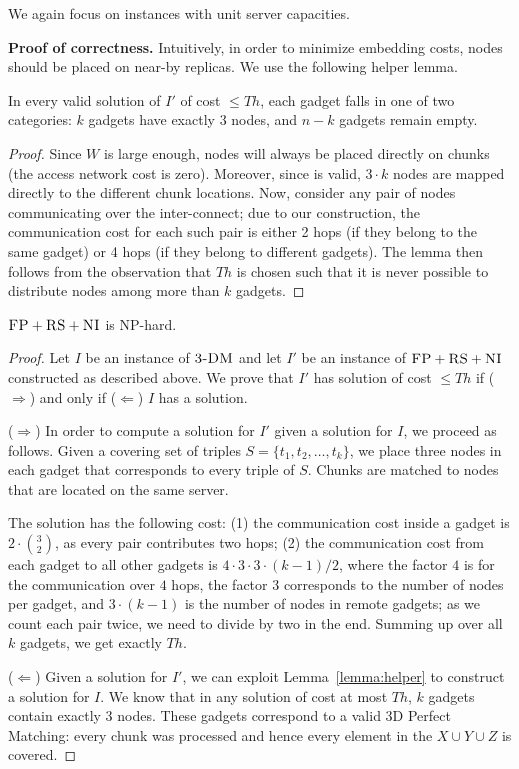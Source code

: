 \documentclass[9pt]{sigcomm-alternate}
\newcommand{\CC}{\textsc{NI}}
\newcommand{\FP}{\textsc{FP}}
\newcommand{\RS}{\textsc{RS}}
\newcommand{\TDM}{\textsc{3-DM}}
\newcommand{\Thr}{\ensuremath{Th}}
\begin{document}
We again focus on instances with unit server capacities.

\textbf{Proof of correctness.}
Intuitively, in order to minimize embedding costs,
nodes should be placed on near-by replicas. We use the following
helper lemma.
\begin{lemma}\label{lemma:helper}
In every valid solution of $I'$ of cost $\leq \Thr$, each gadget
falls in one of two categories:
$k$ gadgets have exactly
$3$ nodes, and $n-k$ gadgets remain empty.
\end{lemma}
\begin{proof}
Since $W$ is large enough, nodes will always be placed
directly on chunks (the access network cost is zero).
Moreover, since
is valid, $3 \cdot k$ nodes are mapped
directly to the different chunk locations.
Now, consider any pair of nodes communicating over the
inter-connect; due to our construction, the communication cost
for each such pair is either
2 hops (if they belong to the same gadget) or 4 hops (if they belong
to different gadgets).
The lemma then follows from the observation that $\Thr$
is chosen such that it is never possible to distribute nodes
among more than $k$ gadgets.
\end{proof}

\begin{theorem}
$\FP+\RS+\CC$ is NP-hard.
\end{theorem}
\begin{proof}
Let $I$ be an instance of $\TDM$ and let $I'$ be an instance of
$\FP+\RS+\CC$ constructed as described above.
We prove that $I'$ has solution of cost $\leq \Thr$ if ($\Rightarrow$) and only if
($\Leftarrow$)
$I$ has a solution.

($\Rightarrow$) In order to compute a solution
for $I'$ given a solution for $I$, we proceed as follows.
Given a covering set of triples $S = \{t_1, t_2, \ldots, t_k\}$, we place three nodes in each gadget that
corresponds to every triple of $S$. Chunks are matched to nodes that are located
on the same server.

The solution has the following cost:
(1) the communication cost inside a gadget is $2 \cdot {3 \choose 2}$,
  as every pair contributes two hops;
  (2) the communication cost from each gadget to all other gadgets is $4
  \cdot 3 \cdot 3 \cdot (k - 1) / 2$, where the factor $4$ is
  for the
  communication over $4$ hops, the factor $3$
  corresponds to the number of nodes per gadget, and
  $3 \cdot (k-1)$ is the number of nodes in remote gadgets;
  as we count each pair twice, we need to divide by two in the end.
Summing up over all $k$ gadgets, we get exactly $\Thr$.

($\Leftarrow$) Given a solution for $I'$,
we can exploit Lemma~\ref{lemma:helper} to construct a solution for $I$.
We know that in any solution of cost at most $\Thr$,
$k$ gadgets contain exactly 3 nodes. These gadgets correspond to a valid
3D Perfect Matching: every
chunk was processed and hence every element in the $X \cup Y \cup Z$ is covered.
\end{proof}
\end{document}
